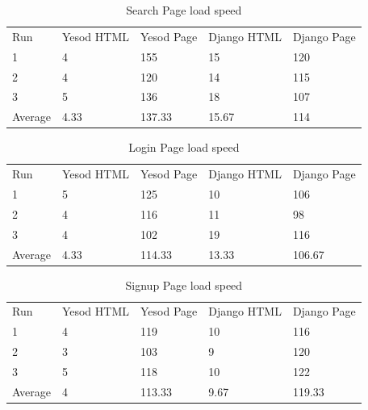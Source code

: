 \begin{table}[H]
    \caption{Search Page load speed}
    \begin{center}
        \begin{tabular}{ | l | l | l | l | l |}
            \hline
            Run & Yesod HTML & Yesod Page & Django HTML & Django Page \\
            1 & 4 & 155 & 15 & 120 \\
            2 & 4 & 120 & 14 & 115 \\
            3 & 5 & 136 & 18 & 107 \\
            Average & 4.33 & 137.33 & 15.67 & 114 \\
            \hline
        \end{tabular}
    \end{center}
    \label{tab:searchLoadSpeeds}
\end{table}

\begin{table}[H]
    \caption{Login Page load speed}
    \begin{center}
        \begin{tabular}{ | l | l | l | l | l |}
            \hline
            Run & Yesod HTML & Yesod Page & Django HTML & Django Page \\
            1 & 5 & 125 & 10 & 106 \\
            2 & 4 & 116 & 11 & 98 \\
            3 & 4 & 102 & 19 & 116 \\
            Average & 4.33 & 114.33 & 13.33 & 106.67 \\
            \hline
        \end{tabular}
    \end{center}
    \label{tab:loginLoadSpeeds}
\end{table}

\begin{table}[H]
    \caption{Signup Page load speed}
    \begin{center}
        \begin{tabular}{ | l | l | l | l | l |}
            \hline
            Run & Yesod HTML & Yesod Page & Django HTML & Django Page \\
            1 & 4 & 119 & 10 & 116 \\
            2 & 3 & 103 & 9 & 120 \\
            3 & 5 & 118 & 10 & 122 \\
            Average & 4 & 113.33 & 9.67 & 119.33 \\
            \hline
        \end{tabular}
    \end{center}
    \label{tab:signupLoadSpeeds}
\end{table}

